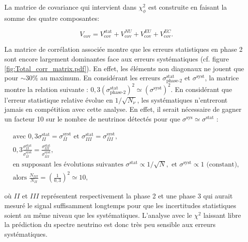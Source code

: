 La matrice de covariance qui intervient dans $\chi^2_{\phi}$ est construite en faisant la somme des quatre composantes:

\begin{equation}
    V_\textrm{cov} = V_\textrm{cov}^\textrm{stat} + V_\textrm{cov}^{NU} + V_\textrm{cov}^{EU} + V_\textrm{cov}^{EC}.
\end{equation}

\bigbreak

La matrice de corrélation associée montre que les erreurs statistiques en phase 2 sont encore largement dominantes face aux erreurs systématiques (cf. figure \ref{fig:Total_corr_matrix.pdf}). En effet, les éléments non diagonaux ne jouent que pour $\sim 30 \%$ au maximum. En considérant les erreurs $\sigma^\textrm{stat}_\textrm{phase-2}$ et $\sigma^\textrm{syst}$, la matrice montre la relation suivante : $0,3(\sigma^\textrm{stat}_\textrm{phase-2})^2 \simeq (\sigma^\textrm{syst})^2$. En considérant que l'erreur statistique relative évolue en $1/\sqrt{N_\nu}$, les systématiques n'entreront jamais en compétition avec cette analyse. En effet, il serait nécessaire de gagner un facteur 10 sur le nombre de neutrinos détectés pour que $\sigma^\textrm{sys} \simeq \sigma^\textrm{stat}$ :

\begin{equation}
\begin{gathered}
    \textrm{avec } 0,3 \sigma^\textrm{stat}_{II} = \sigma^\textrm{syst}_{II} \textrm{ et } \sigma^\textrm{stat}_{III} = \sigma^\textrm{syst}_{III},\\
    0,3\frac{\sigma^\textrm{stat}_{II}}{\sigma^\textrm{syst}_{II}} = \frac{\sigma^\textrm{stat}_{III}}{\sigma^\textrm{syst}_{III}},\\
    \textrm{en supposant les évolutions suivantes } \sigma^\textrm{stat} \propto 1/\sqrt{N}, \textrm{ et } \sigma^\textrm{syst} \propto 1 \textrm{ (constant)},\\
    \textrm{alors } \frac{N_{III}}{N_{II}} = \left(\frac{1}{0,3}\right)^2 \simeq 10,
\end{gathered}
\end{equation}

où $II$ et $III$ représentent respectivement la phase 2 et une \og phase 3 \fg{} qui aurait mesuré le signal suffisamment longtemps pour que les incertitudes statistiques soient au même niveau que les systématiques. L'analyse avec le $\chi^2$ laissant libre la prédiction du spectre neutrino est donc très peu sensible aux erreurs systématiques.\\

